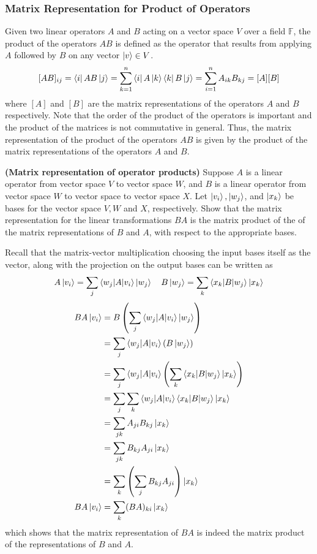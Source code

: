 \subsubsection{Matrix Representation for Product of Operators}
Given two linear operators $A$ and $B$ acting on a vector space $V$ over a field $\mathbb{F}$, the product of the operators $AB$ is defined as the operator that results from applying $A$ followed by $B$ on any vector $\ket{v}\in V$.
\[[AB]_{ij}=\bra{i}AB\ket{j}=\sum_{k=1}^n \bra{i}A\ket{k}\bra{k}B\ket{j}=\sum_{i=1}^n A_{ik}B_{kj}=[A][B]\]
where $[A]$ and $[B]$ are the matrix representations of the operators $A$ and $B$ respectively. Note that the order of the product of the operators is important and the product of the matrices is not commutative in general. 
Thus, the matrix representation of the product of the operators $AB$ is given by the product of the matrix representations of the operators $A$ and $B$.

\begin{example}
\textbf{(Matrix representation of operator products)} Suppose $A$ is a linear operator from vector space $V$ to vector space $W$, and $B$ is a linear operator from vector space $W$ to vector space to vector space $X$. Let $\ket{v_i},\ket{w_j}$, and $\ket{x_k}$ be bases for the vector space $V,W$ and $X$, respectively. Show that the matrix representation for the linear transformations $BA$ is the matrix product of the of the matrix representations of $B$ and $A$, with respect to the appropriate bases.

Recall that the matrix-vector multiplication choosing the input bases itself as the vector, along with the projection on the output bases can be written as
\[
A\ket{v_i}=\sum_j \braket{w_j|A|v_i} \ket{w_j} \quad B\ket{w_j}=\sum_k \braket{x_k|B|w_j} \ket{x_k}
\]
\begin{align*}
BA\ket{v_i}&=B\left(\sum_j \braket{w_j|A|v_i} \ket{w_j}\right)\\
&=\sum_j \braket{w_j|A|v_i} \left( B\ket{w_j}\right)\\
&=\sum_j \braket{w_j|A|v_i} \left(\sum_k \braket{x_k|B|w_j}\ket{x_k}\right)\\
&= \sum_{j} \sum_k \braket{w_j|A|v_i} \braket{x_k|B|w_j} \ket{x_k}\\
&= \sum_{jk} A_{ji}B_{kj} \ket{x_k}\\
&=\sum_{jk} B_{kj} A_{ji} \ket{x_k}\\
&=\sum_k \left(\sum_j B_{kj}A_{ji} \right) \ket{x_k}\\
BA\ket{v_i}&=\sum_k (BA)_{ki} \ket{x_k}
\end{align*}
which shows that the matrix representation of $BA$ is indeed the matrix product of the representations of $B$ and $A$.
\end{example}

